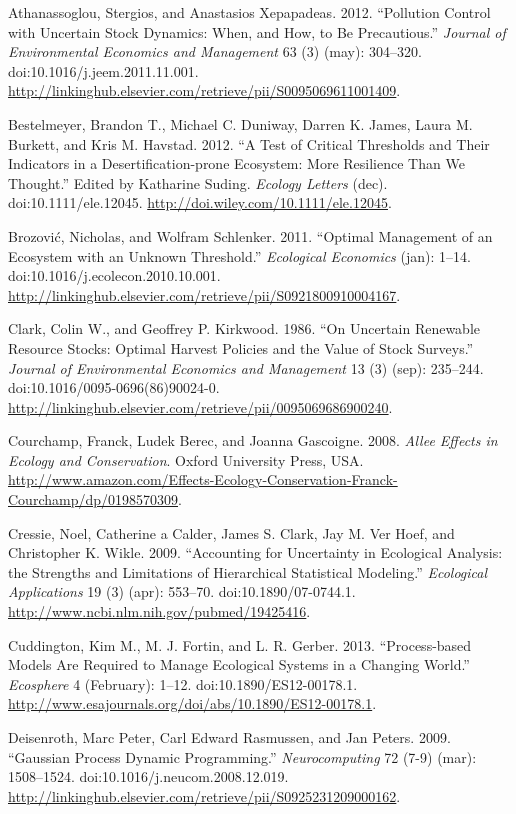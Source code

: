 \documentclass[author-year, review]{elsarticle} %
\begin{document}
Athanassoglou, Stergios, and Anastasios Xepapadeas. 2012. ``Pollution
Control with Uncertain Stock Dynamics: When, and How, to Be
Precautious.'' \emph{Journal of Environmental Economics and Management}
63 (3) (may): 304--320. doi:10.1016/j.jeem.2011.11.001.
\url{http://linkinghub.elsevier.com/retrieve/pii/S0095069611001409}.

Bestelmeyer, Brandon T., Michael C. Duniway, Darren K. James, Laura M.
Burkett, and Kris M. Havstad. 2012. ``A Test of Critical Thresholds and
Their Indicators in a Desertification-prone Ecosystem: More Resilience
Than We Thought.'' Edited by Katharine Suding. \emph{Ecology Letters}
(dec). doi:10.1111/ele.12045.
\url{http://doi.wiley.com/10.1111/ele.12045}.

Brozović, Nicholas, and Wolfram Schlenker. 2011. ``Optimal Management of
an Ecosystem with an Unknown Threshold.'' \emph{Ecological Economics}
(jan): 1--14. doi:10.1016/j.ecolecon.2010.10.001.
\url{http://linkinghub.elsevier.com/retrieve/pii/S0921800910004167}.

Clark, Colin W., and Geoffrey P. Kirkwood. 1986. ``On Uncertain
Renewable Resource Stocks: Optimal Harvest Policies and the Value of
Stock Surveys.'' \emph{Journal of Environmental Economics and
Management} 13 (3) (sep): 235--244. doi:10.1016/0095-0696(86)90024-0.
\url{http://linkinghub.elsevier.com/retrieve/pii/0095069686900240}.

Courchamp, Franck, Ludek Berec, and Joanna Gascoigne. 2008. \emph{Allee
Effects in Ecology and Conservation}. Oxford University Press, USA.
\url{http://www.amazon.com/Effects-Ecology-Conservation-Franck-Courchamp/dp/0198570309}.

Cressie, Noel, Catherine a Calder, James S. Clark, Jay M. Ver Hoef, and
Christopher K. Wikle. 2009. ``Accounting for Uncertainty in Ecological
Analysis: the Strengths and Limitations of Hierarchical Statistical
Modeling.'' \emph{Ecological Applications} 19 (3) (apr): 553--70.
doi:10.1890/07-0744.1.
\url{http://www.ncbi.nlm.nih.gov/pubmed/19425416}.

Cuddington, Kim M., M. J. Fortin, and L. R. Gerber. 2013.
``Process-based Models Are Required to Manage Ecological Systems in a
Changing World.'' \emph{Ecosphere} 4 (February): 1--12.
doi:10.1890/ES12-00178.1.
\url{http://www.esajournals.org/doi/abs/10.1890/ES12-00178.1}.

Deisenroth, Marc Peter, Carl Edward Rasmussen, and Jan Peters. 2009.
``Gaussian Process Dynamic Programming.'' \emph{Neurocomputing} 72 (7-9)
(mar): 1508--1524. doi:10.1016/j.neucom.2008.12.019.
\url{http://linkinghub.elsevier.com/retrieve/pii/S0925231209000162}.
\end{document}
